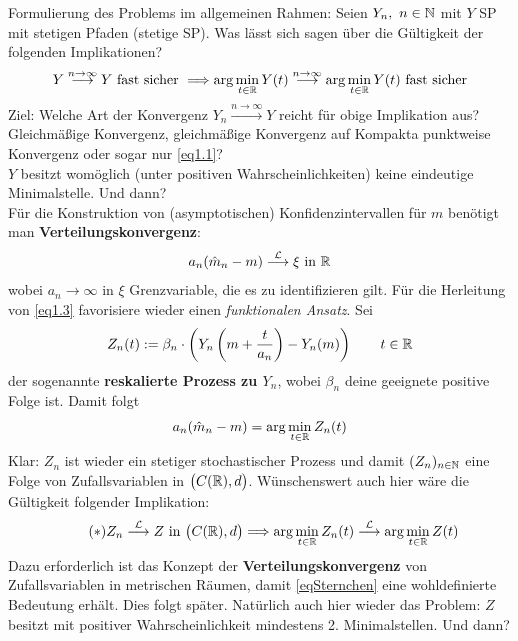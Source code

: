 Formulierung des Problems im allgemeinen Rahmen:
Seien $Y_n,~n\in\mathbb{N}$ mit $Y$ SP mit stetigen Pfaden (stetige SP).
Was lässt sich sagen über die Gültigkeit der folgenden Implikationen?
\begin{align}
Y
\stackrel{n\to\infty}{\longrightarrow}
Y\text{ fast sicher }
\Longrightarrow
\arg\min\limits_{t\in\mathbb{R}} Y(t)
\stackrel{n\to\infty}{\longrightarrow}
\arg\min\limits_{t\in\mathbb{R}} Y(t)\text{ fast sicher}
\end{align}
Ziel: Welche Art der Konvergenz $Y_n\stackrel{n\to\infty}{\longrightarrow} Y$ reicht für obige Implikation aus? Gleichmäßige Konvergenz, gleichmäßige Konvergenz auf Kompakta punktweise Konvergenz oder sogar nur \eqref{eq1.1}?\\
$Y$ besitzt womöglich (unter positiven Wahrscheinlichkeiten) keine eindeutige Minimalstelle. Und dann?\\

Für die Konstruktion von (asymptotischen) Konfidenzintervallen für $m$ benötigt man \textbf{Verteilungskonvergenz}:
\begin{align}\label{eq1.3}
a_n(\hat{m}_n-m)
\stackrel{\mathcal{L}}{\longrightarrow}\xi\text{ in }\mathbb{R}
\end{align}
wobei $a_n\to\infty$ in $\xi$ Grenzvariable, die es zu identifizieren gilt. Für die Herleitung von \eqref{eq1.3} favorisiere wieder einen \textit{funktionalen Ansatz}. Sei
\begin{align*}
Z_n(t):=\beta_n\cdot\left( Y_n\left(m+\frac{t}{a_n}\right)-Y_n(m)\right)\qquad t\in\mathbb{R}
\end{align*}
der sogenannte \textbf{reskalierte Prozess zu $Y_n$}, wobei $\beta_n$ deine geeignete positive Folge ist. Damit folgt
\begin{align}\label{1.4}
a_n(\hat{m}_n-m)=\arg\min\limits_{t\in\mathbb{R}} Z_n(t)
\end{align}
Klar: $Z_n$ ist wieder ein stetiger stochastischer Prozess und damit $(Z_n)_{n\in\mathbb{N}}$ eine Folge von Zufallsvariablen in $\big(C(\mathbb{R}),d\big)$. Wünschenswert auch hier wäre die Gültigkeit folgender Implikation:
\begin{align}\label{eqSternchen}\tag{$\ast$}
Z_n
\stackrel{\mathcal{L}}{\longrightarrow}
Z\text{ in } \big(C(\mathbb{R}),d\big)
\Longrightarrow
\arg\min\limits_{t\in\mathbb{R}} Z_n(t)
\stackrel{\mathcal{L}}{\longrightarrow}
\arg\min\limits_{t\in\mathbb{R}} Z(t)
\end{align}
Dazu erforderlich ist das Konzept der \textbf{Verteilungskonvergenz} von Zufallsvariablen in metrischen Räumen, damit \eqref{eqSternchen} eine wohldefinierte Bedeutung erhält. Dies folgt später. Natürlich auch hier wieder das Problem: $Z$ besitzt mit positiver Wahrscheinlichkeit mindestens 2. Minimalstellen. Und dann?\\

